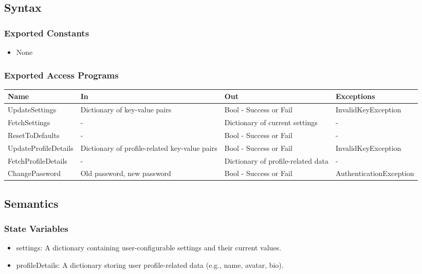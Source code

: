 \documentclass[12pt, titlepage]{article}
\begin{document}
\subsection{Syntax}

\subsubsection{Exported Constants}

\begin{itemize}
    \item None
\end{itemize}

\subsubsection{Exported Access Programs}

\begin{center}
\begin{tabular}{p{4cm} p{4cm} p{4cm} p{4cm}}
\hline
\textbf{Name} & \textbf{In} & \textbf{Out} & \textbf{Exceptions} \\
\hline
UpdateSettings & Dictionary of key-value pairs & Bool - Success or Fail & InvalidKeyException \\
\hline
FetchSettings & - & Dictionary of current settings & - \\
\hline
ResetToDefaults & - & Bool - Success or Fail & - \\
\hline
UpdateProfileDetails & Dictionary of profile-related key-value pairs & Bool - Success or Fail & InvalidKeyException \\
\hline
FetchProfileDetails & - & Dictionary of profile-related data & - \\
\hline
ChangePassword & Old password, new password & Bool - Success or Fail & AuthenticationException \\
\hline
\end{tabular}
\end{center}


\subsection{Semantics}

\subsubsection{State Variables}

\begin{itemize}
    \item settings: A dictionary containing user-configurable settings and their current values.
    \item profileDetails: A dictionary storing user profile-related data (e.g., name, avatar, bio).
\end{itemize}
\end{document}
